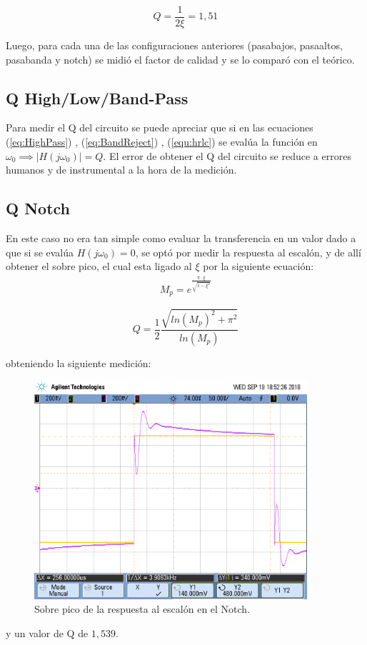 \begin{equation}
    Q=\frac{1}{2\xi}=1,51
\end{equation}

Luego, para cada una de las configuraciones anteriores (pasabajos, pasaaltos, pasabanda y notch) se midió el factor de calidad y se lo comparó con el teórico.
\subsection{Q High/Low/Band-Pass}
Para medir el Q del circuito se puede apreciar que si en las ecuaciones (\ref{eq:HighPass}) , (\ref{eq:BandReject}) , (\ref{equ:hrlc}) se evalúa la función en $\omega_0 \implies |H(j\omega_0)|=Q$. El error de obtener el Q del circuito se reduce a errores humanos y de instrumental a la hora de la medición.

\subsection{Q Notch}
En este caso no era tan simple como evaluar la transferencia en un valor dado a que si se evalúa $H(j\omega_0)=0$, se optó por medir la respuesta al escalón, y de allí obtener el sobre pico, el cual esta ligado al $\xi$ por la siguiente ecuación:
\begin{align}M_p = e^{\frac{\pi \cdot \xi}{\sqrt{1-\xi^2}}} \end{align}

\begin{equation}
Q =  \frac{1}{2} \frac{\sqrt{ln(M_p)^2 + \pi^2}}{ln(M_p)}
\end{equation}

obteniendo la siguiente medición:
\begin{figure}[H]
	\centering
	\includegraphics[width=0.9\textwidth]{Mediciones_pendrive_alan/ej4sobrepiconotch.png}
\caption{Sobre pico de la respuesta al escalón en el Notch.}
	\label{fig:Overshoot5}
\end{figure}

y un valor de Q de $1,539$.



